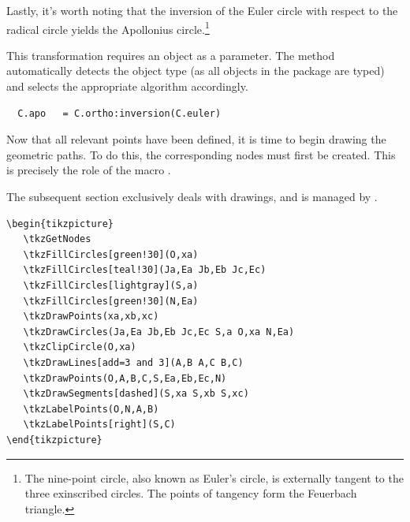 \vspace{1em}

Lastly, it's worth noting that the inversion of the Euler circle with respect to the radical circle yields the Apollonius circle.\footnote{The nine-point circle, also known as Euler's circle, is externally tangent to the three exinscribed circles. The points of tangency form the Feuerbach triangle.}

This transformation requires an object as a parameter. The method automatically detects the object type (as all objects in the package are typed) and selects the appropriate algorithm accordingly.

\begin{mybox}{}
\begin{verbatim}
  C.apo   = C.ortho:inversion(C.euler)
\end{verbatim}
\end{mybox}

Now that all relevant points have been defined, it is time to begin drawing the geometric paths. To do this, the corresponding nodes must first be created. This is precisely the role of the macro .

The subsequent section exclusively deals with drawings, and is managed by .

\begin{verbatim}
\begin{tikzpicture}
   \tkzGetNodes
   \tkzFillCircles[green!30](O,xa)
   \tkzFillCircles[teal!30](Ja,Ea Jb,Eb Jc,Ec)
   \tkzFillCircles[lightgray](S,a)
   \tkzFillCircles[green!30](N,Ea)
   \tkzDrawPoints(xa,xb,xc)
   \tkzDrawCircles(Ja,Ea Jb,Eb Jc,Ec S,a O,xa N,Ea)
   \tkzClipCircle(O,xa)
   \tkzDrawLines[add=3 and 3](A,B A,C B,C)
   \tkzDrawPoints(O,A,B,C,S,Ea,Eb,Ec,N)
   \tkzDrawSegments[dashed](S,xa S,xb S,xc)
   \tkzLabelPoints(O,N,A,B)
   \tkzLabelPoints[right](S,C)
\end{tikzpicture}
\end{verbatim}

